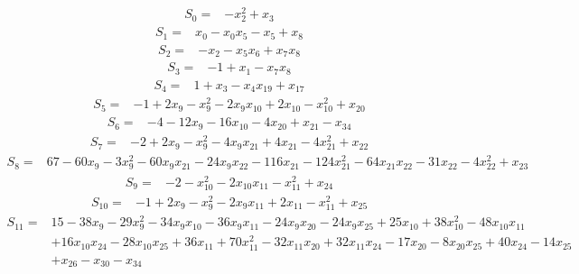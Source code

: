 \begin{align*}
S_{0}={}&-x_{2}^{2}+x_{3}
\end{align*}
\begin{align*}
S_{1}={}&x_{0}-x_{0}x_{5}-x_{5}+x_{8}
\end{align*}
\begin{align*}
S_{2}={}&-x_{2}-x_{5}x_{6}+x_{7}x_{8}
\end{align*}
\begin{align*}
S_{3}={}&-1+x_{1}-x_{7}x_{8}
\end{align*}
\begin{align*}
S_{4}={}&1+x_{3}-x_{4}x_{19}+x_{17}
\end{align*}
\begin{align*}
S_{5}={}&-1+2x_{9}-x_{9}^{2}-2x_{9}x_{10}+2x_{10}-x_{10}^{2}+x_{20}
\end{align*}
\begin{align*}
S_{6}={}&-4-12x_{9}-16x_{10}-4x_{20}+x_{21}-x_{34}
\end{align*}
\begin{align*}
S_{7}={}&-2+2x_{9}-x_{9}^{2}-4x_{9}x_{21}+4x_{21}-4x_{21}^{2}+x_{22}
\end{align*}
\begin{align*}
S_{8}={}&67-60x_{9}-3x_{9}^{2}-60x_{9}x_{21}-24x_{9}x_{22}-116x_{21}-124x_{21}^{2}-64x_{21}x_{22}-31x_{22}-4x_{22}^{2}+x_{23}
\end{align*}
\begin{align*}
S_{9}={}&-2-x_{10}^{2}-2x_{10}x_{11}-x_{11}^{2}+x_{24}
\end{align*}
\begin{align*}
S_{10}={}&-1+2x_{9}-x_{9}^{2}-2x_{9}x_{11}+2x_{11}-x_{11}^{2}+x_{25}
\end{align*}
\begin{align*}
S_{11}={}&15-38x_{9}-29x_{9}^{2}-34x_{9}x_{10}-36x_{9}x_{11}-24x_{9}x_{20}-24x_{9}x_{25}+25x_{10}+38x_{10}^{2}-48x_{10}x_{11}\\
{}&+16x_{10}x_{24}-28x_{10}x_{25}+36x_{11}+70x_{11}^{2}-32x_{11}x_{20}+32x_{11}x_{24}-17x_{20}-8x_{20}x_{25}+40x_{24}-14x_{25}\\
{}&+x_{26}-x_{30}-x_{34}
\end{align*}
